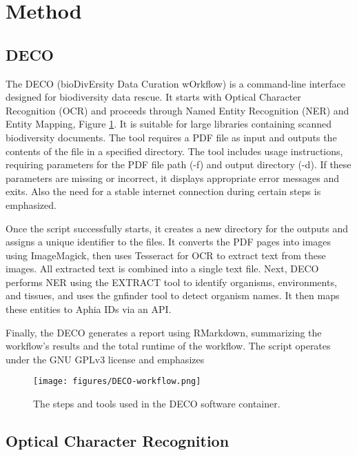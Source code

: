 \section{Method}
\label{sec:deco-method}

    \subsection{DECO}

The DECO (bioDivErsity Data Curation wOrkflow) is a command-line interface
designed for biodiversity data rescue. It starts with Optical Character Recognition
(OCR) and proceeds through Named Entity Recognition (NER) and Entity Mapping, Figure \ref{fig:deco-workflow}.
It is suitable for large libraries containing scanned biodiversity documents.
The tool requires a PDF file as input and outputs the contents of the file in a specified directory.
The tool includes usage instructions, requiring parameters for the PDF file
path (-f) and output directory (-d). If these parameters are missing or incorrect, it displays appropriate error messages and exits.
Also the need for a stable internet connection during certain steps is emphasized.

Once the script successfully starts, it creates a new directory for the outputs
and assigns a unique identifier to the files. It converts the PDF pages into images
using ImageMagick, then uses Tesseract for OCR to extract text from these images.
All extracted text is combined into a single text file. Next, DECO performs NER
using the EXTRACT tool to identify organisms, environments, and tissues, and
uses the gnfinder tool to detect organism names. It then maps these entities to Aphia IDs via an API.

Finally, the DECO generates a report using RMarkdown, summarizing the workflow's results and the total runtime of the workflow.
The script operates under the GNU GPLv3 license and emphasizes 

   \begin{figure}[ht]
      \centering
      \texttt{[image: figures/DECO-workflow.png]}
      \caption[DECO workflow]{The steps and tools used in the DECO software container.}
      \label{fig:deco-workflow}
   \end{figure}


    \subsection{Optical Character Recognition}

